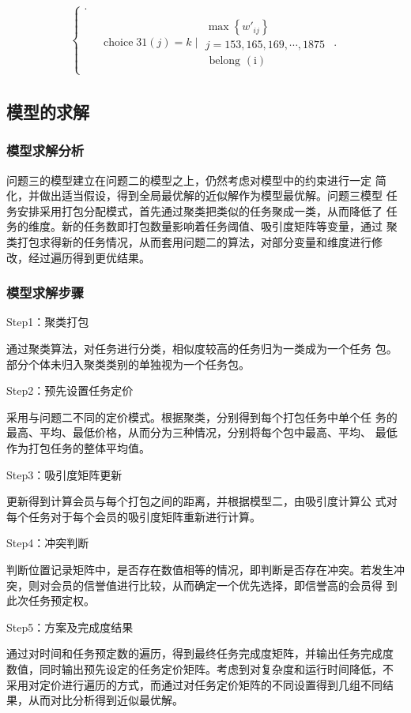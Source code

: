 $$\begin{aligned}
\begin{cases}
       .                                                                \\
        & \begin{array}{l}
           \operatorname{choice} 31(j)=k\mid \begin{array}{l}
               \max \left\{{w'}_{i j}\right\} \\
               j=153,165,169, \cdots, 1875 \\
               \text { belong }(\mathrm{i})
           \end{array}
       \end{array}.
   \end{cases}
\end{aligned}
$$
\subsection{模型的求解}
\subsubsection{模型求解分析}
问题三的模型建立在问题二的模型之上，仍然考虑对模型中的约束进行一定
简化，并做出适当假设，得到全局最优解的近似解作为模型最优解。问题三模型
任务安排采用打包分配模式，首先通过聚类把类似的任务聚成一类，从而降低了
任务的维度。新的任务数即打包数量影响着任务阈值、吸引度矩阵等变量，通过
聚类打包求得新的任务情况，从而套用问题二的算法，对部分变量和维度进行修
改，经过遍历得到更优结果。
\subsubsection{模型求解步骤}
Step1：聚类打包

通过聚类算法，对任务进行分类，相似度较高的任务归为一类成为一个任务
包。部分个体未归入聚类类别的单独视为一个任务包。

Step2：预先设置任务定价

采用与问题二不同的定价模式。根据聚类，分别得到每个打包任务中单个任
务的最高、平均、最低价格，从而分为三种情况，分别将每个包中最高、平均、
最低作为打包任务的整体平均值。

Step3：吸引度矩阵更新

更新得到计算会员与每个打包之间的距离，并根据模型二，由吸引度计算公
式对每个任务对于每个会员的吸引度矩阵重新进行计算。

Step4：冲突判断

判断位置记录矩阵中，是否存在数值相等的情况，即判断是否存在冲突。若发生冲突，则对会员的信誉值进行比较，从而确定一个优先选择，即信誉高的会员得
到此次任务预定权。

Step5：方案及完成度结果

通过对时间和任务预定数的遍历，得到最终任务完成度矩阵，并输出任务完成度
数值，同时输出预先设定的任务定价矩阵。考虑到对复杂度和运行时间降低，不
采用对定价进行遍历的方式，而通过对任务定价矩阵的不同设置得到几组不同结
果，从而对比分析得到近似最优解。
